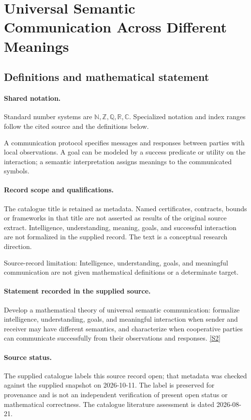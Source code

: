 \documentclass[11pt]{article}
\newcommand{\sref}[2]{\hyperlink{source:#1:#2}{[S#2]}}
\begin{document}
\section{Universal Semantic Communication Across Different Meanings}\label{statement}

\subsection{Definitions and mathematical statement}

\paragraph{Shared notation.}Standard number systems are $\mathbb N,\mathbb Z,\mathbb Q,\mathbb R,\mathbb C$. Specialized notation and index ranges follow the cited source and the definitions below.


A communication protocol specifies messages and responses between parties with local observations. A goal can be modeled by a success predicate or utility on the interaction; a semantic interpretation assigns meanings to the communicated symbols.
\paragraph{Record scope and qualifications.}
The catalogue title is retained as metadata. Named certificates, contracts, bounds or frameworks in that title are not asserted as results of the original source extract.
Intelligence, understanding, meaning, goals, and successful interaction are not formalized in the supplied record. The text is a conceptual research direction.

Source-record limitation: Intelligence, understanding, goals, and meaningful communication are not given mathematical definitions or a determinate target.
\paragraph{Statement recorded in the supplied source.}
Develop a mathematical theory of universal semantic communication: formalize intelligence, understanding, goals, and meaningful interaction when sender and receiver may have different semantics, and characterize when cooperative parties can communicate successfully from their observations and responses. \sref{statement}{2}
\paragraph{Source status.}
The supplied catalogue labels this source record open; that metadata was checked against the supplied snapshot on 2026-10-11. The label is preserved for provenance and is not an independent verification of present open status or mathematical correctness. The catalogue literature assessment is dated 2026-08-21.
\end{document}
